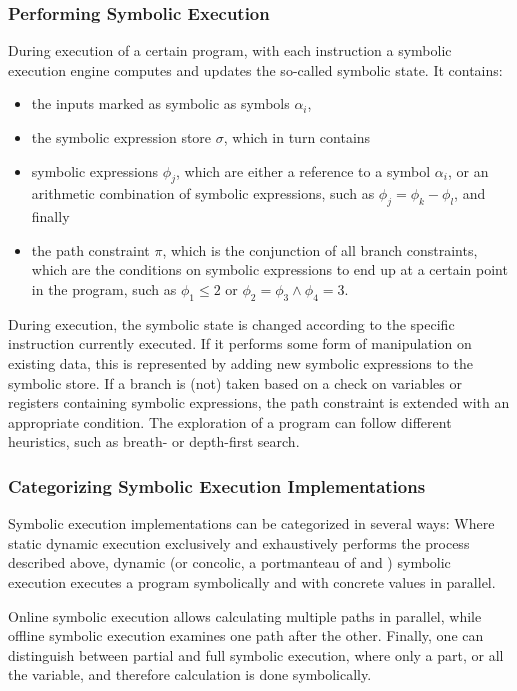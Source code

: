 \documentclass{article}
\begin{document}
\begin{multicols}{2}
    \subsubsection{Performing Symbolic Execution}
    During execution of a certain program, with each instruction a symbolic execution engine computes and updates the so-called symbolic state. It contains:
    \begin{itemize}
        \item the inputs marked as symbolic as symbols $\alpha_i$,
        \item the symbolic expression store $\sigma$, which in turn contains
        \item symbolic expressions $\phi_j$, which are either a reference to a symbol $\alpha_i$, or an arithmetic combination of symbolic expressions, such as $\phi_j=\phi_k-\phi_l$, and finally
        \item the path constraint $\pi$, which is the conjunction of all branch constraints, which are the conditions on symbolic expressions to end up at a certain point in the program, such as $\phi_1\leq2$ or $\phi_2=\phi_3\land\phi_4=3$.
    \end{itemize}

    During execution, the symbolic state is changed according to the specific instruction currently executed. If it performs some form of manipulation on existing data, this is represented by adding new symbolic expressions to the symbolic store. If a branch is (not) taken based on a check on variables or registers containing symbolic expressions, the path constraint is extended with an appropriate condition. The exploration of a program can follow different heuristics, such as breath- or depth-first search.

    \subsubsection{Categorizing Symbolic Execution Implementations}
    Symbolic execution implementations can be categorized in several ways: Where static dynamic execution exclusively and exhaustively performs the process described above, dynamic (or concolic, a portmanteau of  and ) symbolic execution executes a program symbolically and with concrete values in parallel.

    Online symbolic execution allows calculating multiple paths in parallel, while offline symbolic execution examines one path after the other. Finally, one can distinguish between partial and full symbolic execution, where only a part, or all the variable, and therefore calculation is done symbolically.\cite{Ghidrion}


\end{multicols}
\end{document}
